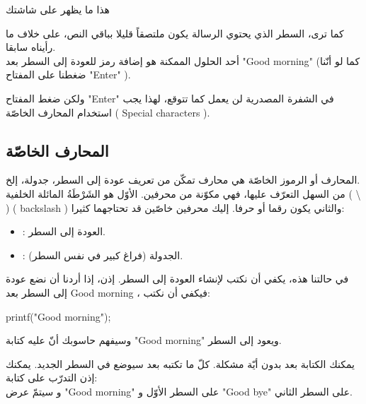 هذا ما يظهر على شاشتك

كما ترى، السطر الذي يحتوي الرسالة يكون ملتصقاً قليلا بباقي النص، على خلاف ما رأيناه سابقا.\\
أحد الحلول الممكنة هو إضافة رمز للعودة إلى السطر بعد
 "\textenglish{Good morning}"
 (كما لو أنّنا ضغطنا على المفتاح
"\textenglish{Enter}"
).

ولكن ضغط المفتاح
"\textenglish{Enter}"
 في الشفرة المصدرية لن يعمل كما تتوقع، لهذا يجب استخدام المحارف الخاصّة (
\textenglish{Special characters}
).

\subsection{المحارف الخاصّة}
المحارف أو الرموز الخاصّة هي محارف تمكّن من تعريف عودة إلى السطر، جدولة، إلخ.\\
من السهل التعرّف عليها، فهي مكوّنة من محرفين. الأوّل هو الشَرْطَةُ المائلة الخلفية (
\textbackslash
) (
\textenglish{backslash}
) والثاني يكون رقما أو حرفا. إليك محرفين خاصّين قد تحتاجهما كثيرا:
\begin{itemize}
  \item {}:
 العودة إلى السطر.
 \item {}:
 الجدولة (فراغ كبير في نفس السطر).
\end{itemize}

في حالتنا هذه، يكفي أن نكتب
 لإنشاء العودة إلى السطر. إذن، إذا أردنا أن نضع عودة إلى السطر بعد
\textenglish{Good morning}
، فيكفي أن نكتب:
\begin{Csource}
printf("Good morning\n");
\end{Csource}

وسيفهم حاسوبك أنّ عليه كتابة
"\textenglish{Good morning}"
 ويعود إلى السطر.

\begin{information}
  يمكنك الكتابة بعد
بدون أيّة مشكلة. كلّ ما تكتبه بعد
 سيوضع في السطر الجديد. يمكنك إذن التدرّب على كتابة:
\\
و سيتمّ عرض
"\textenglish{Good morning}"
على السطر الأوّل و
"\textenglish{Good bye}"
على السطر الثاني.
\end{information}

